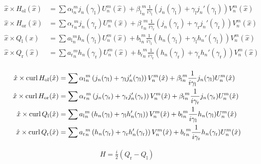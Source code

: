\begin{align*}
  \hat{x}\times H_{\text{ol}}(\hat{x}) &= \sum{\alpha_\text{l}}_n^m j_n(\gamma_\text{l}) U_n^m(\hat{x}) + {\beta_\text{l}}_n^m\frac{1}{i\gamma_\text{l}} \left(j_n(\gamma_\text{l}) + \gamma_\text{l} j_n'(\gamma_\text{l})\right) V_n^m(\hat{x}) \\
  \hat{x}\times H_{\text{or}}(\hat{x}) &= \sum{\alpha_\text{r}}_n^m j_n(\gamma_\text{r}) U_n^m(\hat{x}) + {\beta_\text{r}}_n^m\frac{1}{i\gamma_\text{r}} \left(j_n(\gamma_\text{r}) + \gamma_\text{r} j_n'(\gamma_\text{r})\right) V_n^m(\hat{x}) \\
  \hat{x}\times Q_\text{l}(\hat{x}) &= \sum {a_\text{l}}_n^m h_n(\gamma_\text{l}) U_n^m(\hat{x}) + {b_\text{l}}_n^m\frac{1}{i\gamma_\text{l}} \left(h_n(\gamma_\text{l}) + \gamma_\text{l} h_n'(\gamma_\text{l})\right) V_n^m(\hat{x}) \\
  \hat{x}\times Q_\text{r}(\hat{x}) &= \sum {a_\text{r}}_n^m h_n(\gamma_\text{r}) U_n^m(\hat{x}) + {b_\text{r}}_n^m\frac{1}{i\gamma_\text{r}} \left(h_n(\gamma_\text{r}) + \gamma_\text{r} h_n'(\gamma_\text{r})\right) V_n^m(\hat{x}) \\
\end{align*}

\begin{align*}
  \hat{x}\times \operatorname{curl} H_{\text{ol}}(\hat{x}) &= \sum{\alpha_\text{l}}_n^m\left(j_n(\gamma_\text{l}) + \gamma_\text{l} j_n'(\gamma_\text{l})\right) V_n^m(\hat{x}) + {\beta_\text{l}}_n^m\frac{1}{i\gamma_\text{l}} j_n(\gamma_\text{l}) U_n^m(\hat{x}) \\
  \hat{x}\times \operatorname{curl} H_{\text{or}}(\hat{x}) &= \sum{\alpha_\text{r}}_n^m\left(j_n(\gamma_\text{r}) + \gamma_\text{r} j_n'(\gamma_\text{r})\right) V_n^m(\hat{x}) + {\beta_\text{l}}_n^m\frac{1}{i\gamma_\text{r}} j_n(\gamma_\text{r}) U_n^m(\hat{x}) \\
  \hat{x}\times \operatorname{curl} Q_\text{l}(\hat{x}) &= \sum {a_\text{l}}_n^m\left(h_n(\gamma_\text{l}) + \gamma_\text{l} h_n'(\gamma_\text{l})\right) V_n^m(\hat{x}) + {b_\text{l}}_n^m\frac{1}{i\gamma_\text{l}} h_n(\gamma_\text{l}) U_n^m(\hat{x}) \\
  \hat{x}\times \operatorname{curl} Q_\text{r}(\hat{x}) &= \sum {a_\text{r}}_n^m\left(h_n(\gamma_\text{r}) + \gamma_\text{r} h_n'(\gamma_\text{r})\right) V_n^m(\hat{x}) + {b_\text{r}}_n^m\frac{1}{i\gamma_\text{r}} h_n(\gamma_\text{r}) U_n^m(\hat{x}) \\
\end{align*}

\begin{align*}
  H = \frac{i}{2}\left(Q_\text{r} - Q_\text{l}\right)
\end{align*}

